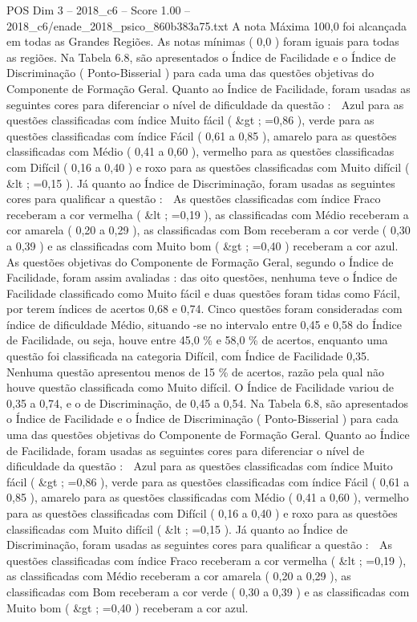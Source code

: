 \begin{textsample}{POS Dim 3 – 2018\_c6 – Score 1.00 – 2018\_c6/enade\_2018\_psico\_860b383a75.txt}
A nota Máxima 100,0 foi alcançada em todas as Grandes Regiões.
As notas mínimas ( 0,0 ) foram iguais para todas as regiões.
Na Tabela 6.8, são apresentados o Índice de Facilidade e o Índice de Discriminação ( Ponto-Bisserial ) para cada uma das questões objetivas do Componente de Formação Geral.
Quanto ao Índice de Facilidade, foram usadas as seguintes cores para diferenciar o nível de dificuldade da questão :  Azul para as questões classificadas com índice Muito fácil ( \&gt ; =0,86 ), verde para as questões classificadas com índice Fácil ( 0,61 a 0,85 ), amarelo para as questões classificadas com Médio ( 0,41 a 0,60 ), vermelho para as questões classificadas com Difícil ( 0,16 a 0,40 ) e roxo para as questões classificadas com Muito difícil ( \&lt ; =0,15 ).
Já quanto ao Índice de Discriminação, foram usadas as seguintes cores para qualificar a questão :  As questões classificadas com índice Fraco receberam a cor vermelha ( \&lt ; =0,19 ), as classificadas com Médio receberam a cor amarela ( 0,20 a 0,29 ), as classificadas com Bom receberam a cor verde ( 0,30 a 0,39 ) e as classificadas com Muito bom ( \&gt ; =0,40 ) receberam a cor azul.
As questões objetivas do Componente de Formação Geral, segundo o Índice de Facilidade, foram assim avaliadas : das oito questões, nenhuma teve o Índice de Facilidade classificado como Muito fácil e duas questões foram tidas como Fácil, por terem índices de acertos 0,68 e 0,74.
Cinco questões foram consideradas com índice de dificuldade Médio, situando -se no intervalo entre 0,45 e 0,58 do Índice de Facilidade, ou seja, houve entre 45,0 \% e 58,0 \% de acertos, enquanto uma questão foi classificada na categoria Difícil, com Índice de Facilidade 0,35.
Nenhuma questão apresentou menos de 15 \% de acertos, razão pela qual não houve questão classificada como Muito difícil.
O Índice de Facilidade variou de 0,35 a 0,74, e o de Discriminação, de 0,45 a 0,54.
Na Tabela 6.8, são apresentados o Índice de Facilidade e o Índice de Discriminação ( Ponto-Bisserial ) para cada uma das questões objetivas do Componente de Formação Geral.
Quanto ao Índice de Facilidade, foram usadas as seguintes cores para diferenciar o nível de dificuldade da questão :  Azul para as questões classificadas com índice Muito fácil ( \&gt ; =0,86 ), verde para as questões classificadas com índice Fácil ( 0,61 a 0,85 ), amarelo para as questões classificadas com Médio ( 0,41 a 0,60 ), vermelho para as questões classificadas com Difícil ( 0,16 a 0,40 ) e roxo para as questões classificadas com Muito difícil ( \&lt ; =0,15 ).
Já quanto ao Índice de Discriminação, foram usadas as seguintes cores para qualificar a questão :  As questões classificadas com índice Fraco receberam a cor vermelha ( \&lt ; =0,19 ), as classificadas com Médio receberam a cor amarela ( 0,20 a 0,29 ), as classificadas com Bom receberam a cor verde ( 0,30 a 0,39 ) e as classificadas com Muito bom ( \&gt ; =0,40 ) receberam a cor azul.

\end{textsample}
